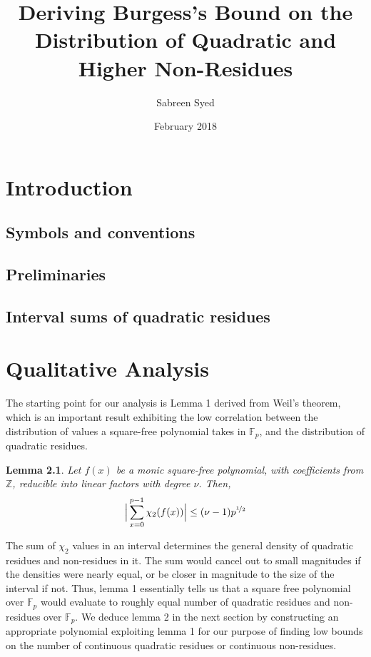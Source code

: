 \documentclass{report}
\title{Deriving Burgess's Bound on the Distribution of Quadratic and Higher Non-Residues}
\author{
  Sabreen Syed\\
  \multicolumn{1}{p{.7\textwidth}}{\centering\emph{Department of Computer Science and Engineering\\
  Indian Institute of Technology Kanpur, India}}}
\date{February 2018}
\newtheorem{lemma}{Lemma}
\begin{document}
\maketitle

\chapter{Introduction}
%
\section{Symbols and conventions}
%
\section{Preliminaries}
%
\section{Interval sums of quadratic residues}
%
\chapter{Qualitative Analysis}
 The starting point for our analysis is Lemma 1 derived from Weil's theorem, which is an important result exhibiting the low correlation between the distribution of values a square-free polynomial takes in $\mathbb{F}_p$, and the distribution of quadratic residues.
%
\begin{lemma}
\cite{burgess}Let $f(x)$ be a monic square-free polynomial, with coefficients from $\mathbb{Z}$, reducible into linear factors with degree $\nu$. Then,
$$\Big\lvert\sum\limits_{x=0}^{p-1}\chi_2(f(x))\Big\rvert\leq (\nu -1)p^{\nicefrac{1}{2}}$$
\end{lemma}
%
The sum of $\chi_2$ values in an interval determines the general density of quadratic residues and non-residues in it. The sum would cancel out to small magnitudes if the densities were nearly equal, or be closer in magnitude to the size of the interval if not. Thus, lemma 1 essentially tells us that a square free polynomial over $\mathbb{F}_p$ would evaluate to roughly equal number of quadratic residues and non-residues over $\mathbb{F}_p$. We deduce lemma 2 in the next section by constructing an appropriate polynomial exploiting lemma 1 for our purpose of finding low bounds on the number of continuous quadratic residues or continuous non-residues.
%
%
\end{document}
